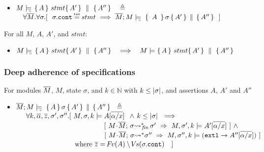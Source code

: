 {\begin{definition}
\begin{itemize}
 \item
 \label{def:hoare:sem:four}
$M \models\!\!\!\!_{_{\circ}}\   \{\, A \, \}\ stmt \{\, A' \, \} \, \,\parallel\,\, \{\, A'' \, \}    \ \ \  \triangleq$ \\
{$\strut  \ \ \  \forall    \Mtwo. \forall  \sigma.[ \ \    \sigma.\prg{cont}\txteq stmt\   \Longrightarrow \ 
{\satDAssertQuadrupleFrom \Mtwo  M  \sigma   {\  A\ } { A'  } {A''} } \ \ ]$%
}

\end{itemize}
\end{definition}
 
 \begin{lemma}
For all $M$, $A$, $A'$, and $stmt$:
\begin{itemize}
\item
$M \models\!\!\!\!_{_{\circ}}\   \{\, A \, \}\ stmt \{\, A' \, \} \, \,\parallel\,\, \{\, A'' \, \}     \ \ \ \Longrightarrow \ \ \ M \models  \{\, A \, \}\ stmt \{\, A' \, \} \, \,\parallel\,\, \{\, A'' \, \}  $
\end{itemize}
\end{lemma}
 
 
\subsubsection{Deep adherence of specifications} 
\label{sect:HLmeans}

{
\begin{definition} 
\label{def:restrict}
For modules $\overline{M}$, $M$, state $\sigma$, and $k\in \mathbb{N}$ with $k\leq |\sigma|$, and assertions $A$, $A'$ and  $A''$
\begin{itemize}
\item
$ {\overline{M};M \models\!\!\!\!_{_{\circ}}\  \, \{\, A\,\}\, \sigma\, \{\, A'\,\} \,\parallel\, \{\, A''\,\}  } \ \ \triangleq \ \ $  \\
$\strut \hspace{.5cm} \forall k,\overline{\alpha}, \overline{z}, \sigma',\sigma''.[
\    %
  \satDAssertFrom M  \sigma k   {A[\overline{\alpha/x}]} \   \, \wedge\,  k \leq  \DepthSt {\sigma}\   \ \Longrightarrow$\\
$\strut \hspace{4.5cm}    [ \ {\leadstoBoundedStarFin {M\madd \Mtwo}{\sigma}  {\sigma'} }\  \Rightarrow \    \satDAssertFrom M  {\sigma'} k   {A'[\overline{\alpha/x}}]\ ]  \ \wedge$\\
$\strut \hspace{4.5cm}    [ \ {\leadstoBoundedStar  {M\madd \Mtwo}{\sigma}  {\sigma''} }\  \Rightarrow\      \satDAssertFrom M  {\sigma''}  k  {(\externalexec \rightarrow A''[\overline{\alpha/x}])} \ ] $\\
$\strut \hspace{2.3cm}\ \ \  \ \ \ \mbox{where } \overline z={{{\hspace{-1pt}F\hspace{-1pt}}v(A)\setminus{\hspace{-1pt}V\hspace{-1pt}}s(\sigma.\mbox{\normalfont{\texttt{cont}}})}}\ \ \ ]$
\end{itemize}
\end{definition}
}

}
